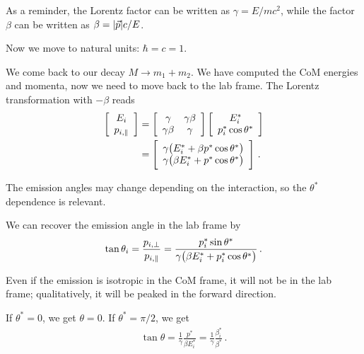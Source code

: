\documentclass[main.tex]{subfiles}
\begin{document}

As a reminder, the Lorentz factor can be written as \(\gamma = E / mc^2\), while the  
factor \(\beta \) can be written as \(\beta = \abs{\vec{p}} c / E\). 

Now we move to natural units: \(\hbar = c = 1\). 

We come back to our decay \(M \to m_1 + m_2 \). 
We have computed the CoM energies and momenta, now we need
to move back to the lab frame. 
The Lorentz transformation with \(- \beta \) reads 
%
\begin{subequations}
\begin{align}
\left[\begin{array}{c}
E_i \\ 
p_{i, \parallel}
\end{array}\right]
&= \left[\begin{array}{cc}
\gamma  & \gamma \beta  \\ 
\gamma \beta  &  \gamma 
\end{array}\right] 
\left[\begin{array}{c}
E_{i}^{*} \\ 
p_{i}^{*} \cos \theta^{*}
\end{array}\right]  \\
&= 
\left[\begin{array}{c}
\gamma \qty(E_i^{*} + \beta p^{*} \cos \theta^{*}) \\ 
\gamma \qty(\beta E_i^{*} + p^{*} \cos \theta^{*})
\end{array}\right]
\,.
\end{align}
\end{subequations}

The emission angles may change depending on the interaction, so the \(\theta^{*}\) dependence is relevant. 

We can recover the emission angle in the lab frame by 
%
\begin{align}
\tan \theta_i = \frac{p_{i, \perp}}{p_{i, \parallel}}
= \frac{p_i^{*} \sin \theta^{*}}{\gamma \qty(\beta E_i^{*} + p_i^{*} \cos \theta^{*})}
\,.
\end{align}

Even if the emission is isotropic in the CoM frame, it will not be in the lab frame; qualitatively, it will be peaked in the forward direction. 

If \(\theta^{*} = 0\), we get \(\theta = 0\).
If \(\theta^{*}= \pi /2\), we get 
%
\begin{align}
\tan \theta = \frac{1}{\gamma } \frac{p^{*}}{\beta E_i^{*}}
= \frac{1}{\gamma } \frac{\beta^{*}_i}{\beta^{*}}
\,.
\end{align}
\end{document}
